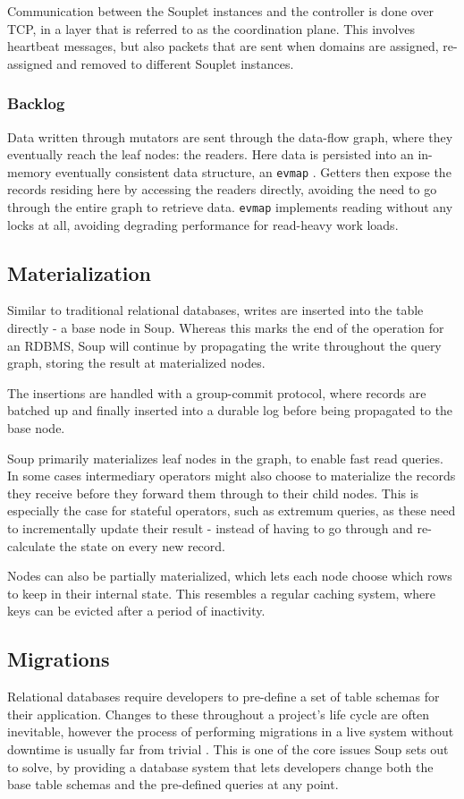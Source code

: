 \documentclass[b5paper]{report}
\begin{document}
Communication between the Souplet instances and the controller is done over TCP,
in a layer that is referred to as the coordination plane. This involves
heartbeat messages, but also packets that are sent when domains are assigned,
re-assigned and removed to different Souplet instances.

\subsubsection{Backlog} \label{sec:readers}
Data written through mutators are sent through the data-flow graph, where they
eventually reach the leaf nodes: the readers. Here data is persisted into an
in-memory eventually consistent data structure, an \texttt{evmap} \cite{evmap}.
Getters then expose the records residing here by accessing the readers directly,
avoiding the need to go through the entire graph to retrieve data.
\texttt{evmap} implements reading without any locks at all, avoiding degrading
performance for read-heavy work loads.

\subsection{Materialization} \label{sec:materialization}
Similar to traditional relational databases, writes are inserted into the
table directly - a base node in Soup. Whereas this marks the end of the
operation for an RDBMS, Soup will continue by propagating the write throughout
the query graph, storing the result at materialized nodes.

The insertions are handled with a group-commit protocol, where records are
batched up and finally inserted into a durable log before being propagated to
the base node.

Soup primarily materializes leaf nodes in the graph, to enable fast read
queries. In some cases intermediary operators might also choose to materialize
the records they receive before they forward them through to their child nodes.
This is especially the case for stateful operators, such as extremum queries, as
these need to incrementally update their result - instead of having to go
through and re-calculate the state on every new record.

Nodes can also be partially materialized, which lets each node choose which rows
to keep in their internal state. This resembles a regular caching system, where
keys can be evicted after a period of inactivity.

\subsection{Migrations}
Relational databases require developers to pre-define a set of table schemas for
their application. Changes to these throughout a project's life cycle are often
inevitable, however the process of performing migrations in a live
system without downtime is usually far from trivial \cite{stripe}. This is one
of the core issues Soup sets out to solve, by providing a database system that
lets developers change both the base table schemas and the pre-defined queries
at any point.
\end{document}
